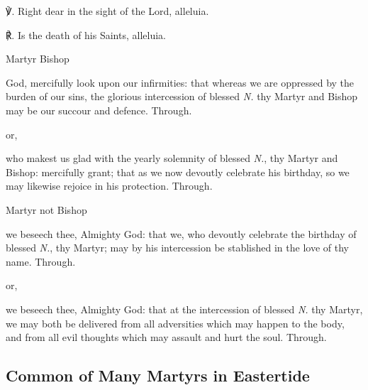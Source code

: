 ℣. Right dear in the sight of the Lord, alleluia.

℟. Is the death of his Saints, alleluia.


\collect

\begin{inhead}\label{CommonMartyrBishopEasterCollect}
	Martyr Bishop
\end{inhead}
 God, mercifully look upon our infirmities: that whereas we are oppressed by the burden of our sins, the glorious intercession of blessed \textit{N.} thy Martyr and Bishop may be our succour and defence. Through.

\begin{inhead}
	or,
\end{inhead}
 who makest us glad with the yearly solemnity of blessed \textit{N.}, thy Martyr and Bishop: mercifully grant; that as we now devoutly celebrate his birthday, so we may likewise rejoice in his protection. Through.

\begin{inhead}\label{CommonMartyrNotBishopEasterCollect}
	Martyr not Bishop
\end{inhead}
 we beseech thee, Almighty God: that we, who devoutly celebrate the birthday of blessed \textit{N.}, thy Martyr; may by his intercession be stablished in the love of thy name. Through.
\begin{inhead}
	or,
\end{inhead}
 we beseech thee, Almighty God: that at the intercession of blessed \textit{N.} thy Martyr, we may both be delivered from all adversities which may happen to the body, and from all evil thoughts which may assault and hurt the soul. Through.



\clearpage
\subsection{Common of Many Martyrs in Eastertide}\label{CommonMartyrsEaster}

